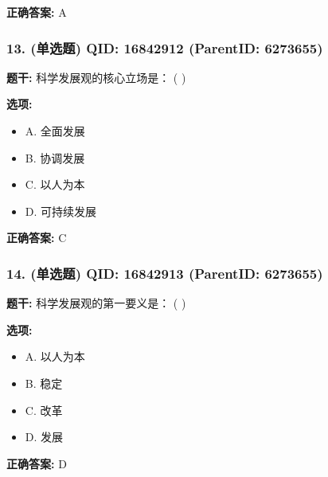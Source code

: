 \documentclass[12pt,UTF8]{ctexart}
\begin{document}
\textbf{正确答案:}
A

\vspace{0.3em}\hrulefill\vspace{0.7em}

\subsubsection*{13. (单选题) \small QID: 16842912 (ParentID: 6273655)}

\textbf{题干:}
科学发展观的核心立场是： ( )



\textbf{选项:}
\begin{itemize}[leftmargin=*]

  \item A. 全面发展

  \item B. 协调发展

  \item C. 以人为本

  \item D. 可持续发展

\end{itemize}

\textbf{正确答案:}
C

\vspace{0.3em}\hrulefill\vspace{0.7em}

\subsubsection*{14. (单选题) \small QID: 16842913 (ParentID: 6273655)}

\textbf{题干:}
科学发展观的第一要义是： ( )



\textbf{选项:}
\begin{itemize}[leftmargin=*]

  \item A. 以人为本

  \item B. 稳定

  \item C. 改革

  \item D. 发展

\end{itemize}

\textbf{正确答案:}
D

\vspace{0.3em}\hrulefill\vspace{0.7em}
\end{document}
